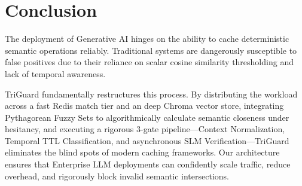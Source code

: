 \documentclass[sigconf]{acmart}
\begin{document}
\section{Conclusion}

The deployment of Generative AI hinges on the ability to cache deterministic semantic operations reliably. Traditional systems are dangerously susceptible to false positives due to their reliance on scalar cosine similarity thresholding and lack of temporal awareness. 

TriGuard fundamentally restructures this process. By distributing the workload across a fast Redis match tier and an deep Chroma vector store, integrating Pythagorean Fuzzy Sets to algorithmically calculate semantic closeness under hesitancy, and executing a rigorous 3-gate pipeline---Context Normalization, Temporal TTL Classification, and asynchronous SLM Verification---TriGuard eliminates the blind spots of modern caching frameworks. Our architecture ensures that Enterprise LLM deployments can confidently scale traffic, reduce overhead, and rigorously block invalid semantic intersections.
\end{document}
